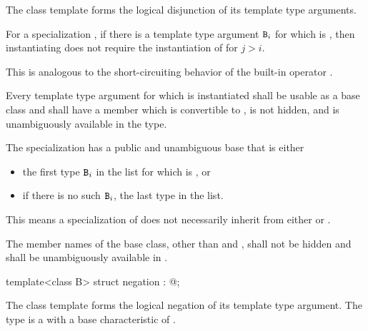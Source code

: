 \begin{itemdescr}
\pnum
The class template 
forms the logical disjunction of its template type arguments.

\pnum
For a specialization ,
if there is a template type argument $\tcode{B}_{i}$
for which  is ,
then instantiating 
does not require the instantiation of  for $j > i$.
\begin{note}
This is analogous to the short-circuiting behavior of
the built-in operator \tcode{||}.
\end{note}

\pnum
Every template type argument
for which  is instantiated
shall be usable as a base class and
shall have a member  which
is convertible to ,
is not hidden, and
is unambiguously available in the type.

\pnum
The specialization 
has a public and unambiguous base that is either
\begin{itemize}
\item the first type $\tcode{B}_{i}$ in the list 
for which  is , or
\item if there is no such $\tcode{B}_{i}$, the last type in the list.
\end{itemize}
\begin{note}
This means a specialization of 
does not necessarily inherit from
either  or .
\end{note}

\pnum
The member names of the base class,
other than  and ,
shall not be hidden and shall be unambiguously available in .
\end{itemdescr}

%
\begin{itemdecl}
template<class B> struct negation : @\seebelow@ { };
\end{itemdecl}

\begin{itemdescr}
\pnum
The class template 
forms the logical negation of its template type argument.
The type 
is a  with a base characteristic of .
\end{itemdescr}

